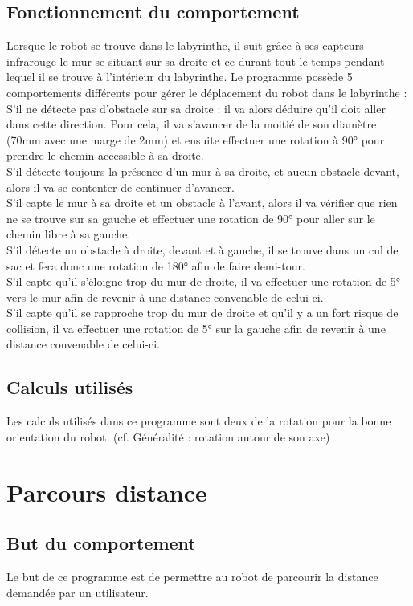 \documentclass[11pt]{article} %
\begin{document}
        	\subsection{Fonctionnement du comportement}
			Lorsque le robot se trouve dans le labyrinthe, il suit grâce à ses capteurs infrarouge le mur se situant sur sa droite et ce durant tout le temps pendant lequel il se trouve à l'intérieur du labyrinthe. Le programme possède 5 comportements différents pour gérer le déplacement du robot dans le labyrinthe : \\ S'il ne détecte pas d'obstacle sur sa droite : il va alors déduire qu'il doit aller dans cette direction. Pour cela, il va s'avancer de la moitié de son diamètre (70mm avec une marge de 2mm) et ensuite effectuer une rotation à 90° pour prendre le chemin accessible à sa droite. \\ S'il détecte toujours la présence d'un mur à sa droite, et aucun obstacle devant, alors il va se contenter de continuer d'avancer. \\ S'il capte le mur à sa droite et un obstacle à l'avant, alors il va vérifier que rien ne se trouve sur sa gauche et effectuer une rotation de 90° pour aller sur le chemin libre à sa gauche. \\ S'il détecte un obstacle à droite, devant et à gauche, il se trouve dans un cul de sac et fera donc une rotation de 180° afin de faire demi-tour. \\ S'il capte qu'il s'éloigne trop du mur de droite, il va effectuer une rotation de 5° vers le mur afin de revenir à une distance convenable de celui-ci. \\ S'il capte qu'il se rapproche trop du mur de droite et qu'il y a un fort risque de collision, il va effectuer une rotation de 5° sur la gauche afin de revenir à une distance convenable de celui-ci.
        	\subsection{Calculs utilisés}
			Les calculs utilisés dans ce programme sont deux de la rotation pour la bonne orientation du robot. (cf. Généralité : rotation autour de son axe)
\section{Parcours distance}
        \subsection{But du comportement}
		Le but de ce programme est de permettre au robot de parcourir la distance demandée par un utilisateur. 
\end{document}
